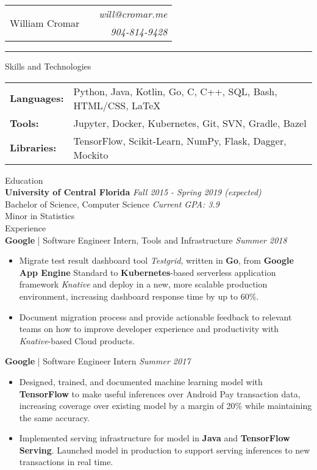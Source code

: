 \documentclass[letterpaper,11pt,oneside]{article}
\newcommand{\mkheader}[3]{
  {\fontfamily{pag}\selectfont
  \begin{tabularx}{\textwidth}{lXr}
    \multirow{2}{*}{\Huge #1} && \emph{#2}
    \\ && \emph{#3}
  \end{tabularx}
  }
  \vspace{2pt}
  \hrule
}
\newcommand{\resheader}[2][]{
  \vspace{9pt}
  {\LARGE #2} #1
  \\
}
\newcommand{\ressubheader}[3][]{
  \vspace{6pt}
  {\large \textbf{#2} #1} \hfill \emph{#3}
  \\
}
\newcommand{\resskill}[1]{\textbf{#1}}
\begin{document}
\mkheader{William Cromar}{will@cromar.me}{904-814-9428}

\resheader{Skills and Technologies}
\vspace{6pt}
\begin{tabular}{>{\bfseries}l@{\hskip .25cm} l}
  Languages: & Python, Java, Kotlin, Go, C, C++, SQL, Bash, HTML/CSS, LaTeX \\
  Tools: & Jupyter, Docker, Kubernetes, Git, SVN, Gradle, Bazel \\
  Libraries: & TensorFlow, Scikit-Learn, NumPy, Flask, Dagger, Mockito \\
\end{tabular}


\resheader{Education}
\ressubheader{University of Central Florida}{Fall 2015 - Spring 2019 (expected)}
Bachelor of Science, Computer Science \hfill \emph{Current GPA: 3.9} \\
Minor in Statistics \\

\resheader{Experience}
\ressubheader[| Software Engineer Intern, Tools and Infrastructure]{Google}{Summer 2018}
\begin{itemize}
  \item Migrate test result dashboard tool \emph{Testgrid}, written in \resskill{Go}, from \resskill{Google App Engine} Standard to \resskill{Kubernetes}-based serverless application framework \emph{Knative} and deploy in a new, more scalable production environment, increasing dashboard response time by up to 60\%.
  \item Document migration process and provide actionable feedback to relevant teams on how to improve developer experience and productivity with \emph{Knative}-based Cloud products.
\end{itemize}

\ressubheader[| Software Engineer Intern]{Google}{Summer 2017}
\begin{itemize}
  \item Designed, trained, and documented machine learning model with \resskill{TensorFlow} to make useful inferences over Android Pay transaction data, increasing coverage over existing model by a margin of 20\% while maintaining the same accuracy.
  \item Implemented serving infrastructure for model in \resskill{Java} and \resskill{TensorFlow Serving}. Launched model in production to support serving inferences to new transactions in real time.
\end{itemize}
\end{document}
